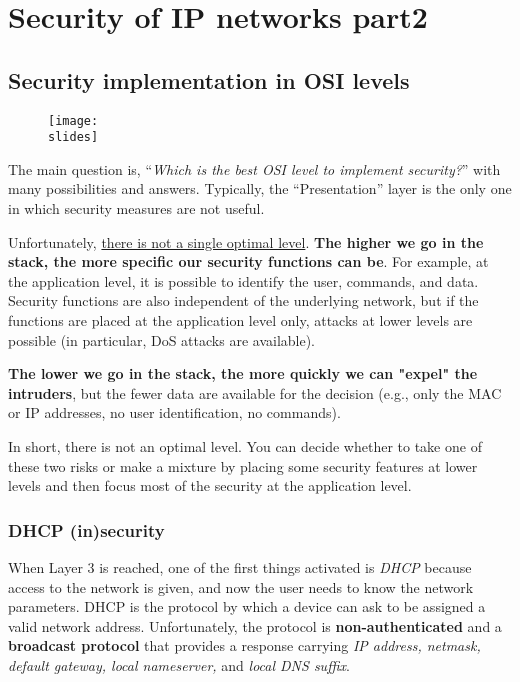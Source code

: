 \chapter{Security of IP networks part2}

\section{Security implementation in OSI levels}

\begin{figure}[h]
    \centering
    \texttt{[image: \\slides]}
\end{figure}

The main question is, “\textit{Which is the best OSI level to implement security?}” with many possibilities and answers. Typically, the “Presentation” layer is the only one in which security measures are not useful.

Unfortunately, \underline{there is not a single optimal level}. \textbf{The higher we go in the stack, the more specific our security functions can be}. For example, at the application level, it is possible to identify the user, commands, and data. Security functions are also independent of the underlying network, but if the functions are placed at the application level only, attacks at lower levels are possible (in particular, DoS attacks are available).

\textbf{The lower we go in the stack, the more quickly we can "expel" the intruders}, but the fewer data are available for the decision (e.g., only the MAC or IP addresses, no user identification, no commands).

In short, there is not an optimal level. You can decide whether to take one of these two risks or make a mixture by placing some security features at lower levels and then focus most of the security at the application level.


\subsection{DHCP (in)security}

When Layer 3 is reached, one of the first things activated is \textit{DHCP} because access to the network is given, and now the user needs to know the network parameters. DHCP is the protocol by which a device can ask to be assigned a valid network address. Unfortunately, the protocol is \textbf{non-authenticated} and a \textbf{broadcast protocol} that provides a response carrying \textit{IP address, netmask, default gateway, local nameserver,} and \textit{local DNS suffix}.

